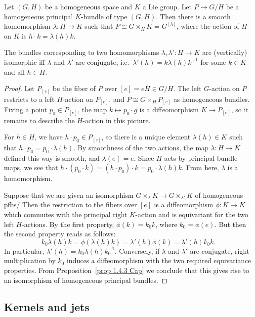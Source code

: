 \begin{prop}
    Let $(G,H)$ be a homogeneous space and $K$ a Lie group. Let $P\to G\slash H$ be a homogeneous principal $K$-bundle of type $(G,H)$. Then there is a smooth homomorphism $\lambda:H\to K$ such that $P\cong G\times_H K=G^{[\lambda]}$, where the action of $H$ on $K$ is $h\cdot k=\lambda(h)k$.

    The bundles corresponding to two homomorphisms $\lambda,\lambda':H\to K$ are (vertically) isomorphic  iff $\lambda$ and $\lambda'$ are conjugate, i.e.\ $\lambda'(h)=k\lambda(h)k^{-1}$ for some $k\in K$ and all $h\in H$.
\end{prop}
\begin{proof}
    Let $P_{[e]}$ be the fiber of $P$ over $[e]=eH\in G\slash H$. The left $G$-action on $P$ restricts to a left $H$-action on $P_{[e]}$, and $P\cong G\times_H P_{[e]}$ as homogeneous bundles. Fixing a point $p_0\in P_{[e]}$, the map $k\mapsto p_0\cdot g$ is a diffeomorphism $K\to P_{[e]}$, so it remains to describe the $H$-action in this picture.

    For $h\in H$, we have $h\cdot p_0\in P_{[e]}$, so there is a unique element $\lambda(h)\in K$ such that $h\cdot p_0=p_0\cdot \lambda(h)$. By smoothness of the two actions, the map $\lambda:H\to K$ defined this way is smooth, and $\lambda(e)=e$. Since $H$ acts by principal bundle maps, we see that $h\cdot (p_0\cdot k)=(h\cdot p_0)\cdot k=p_0\cdot \lambda(h)k$. From here, $\lambda$ is a homomorphism.

    Suppose that we are given an isomorphism $G\times_\lambda K\to G\times_{\lambda'}K$ of homogeneous \glspl{pfb}/ Then the restriction to the fibers over $[e]$ is a diffeomorphism $\phi:K\to K$ which commutes with the principal right $K$-action and is equivariant for the two left $H$-actions. By the first property, $\phi(k)=k_0k$, where $k_0=\phi(e)$. But then the second property reads as follows:
    \[k_0\lambda(h)k=\phi(\lambda(h)k)=\lambda'(h)\phi(k)=\lambda'(h)k_0k.\]
    In particular, $\lambda'(h)=k_0\lambda(h)k_0^{-1}$. Conversely, if $\lambda$ and $\lambda'$ are conjugate, right multiplication by $k_0$ induces a diffeomorphism with the two required equivariance properties. From Proposition~\ref{prop 1.4.3 Cap} we conclude that this gives rise to an isomorphism of homogeneous principal bundles. 
\end{proof}





\subsection{Kernels and jets}


